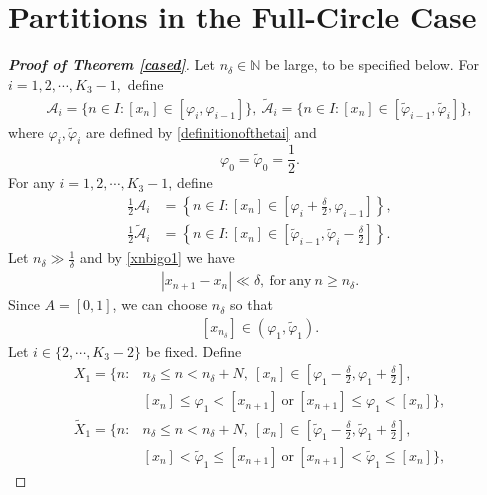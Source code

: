 \documentclass[12pt]{amsart}
\newcommand{\abs}[1]{\left\lvert #1 \right\rvert}
\theoremstyle{plain}
\theoremstyle{definition}
\begin{document}
\section{Partitions in the Full-Circle Case}\label{pcd}
\begin{proof}[\textbf{Proof of Theorem \ref{cased}}]
	Let $n_\delta\in\mathbb{N}$ be large, to be specified below.
	For $i=1,2,\cdots, K_3-1,$ define 
	\begin{align}
		\mathcal{A}_i=\{n\in I: \left[x_n\right]\in [\varphi_i,\varphi_{i-1}]\},\ \tilde{\mathcal{A}}_i=\{n\in I: \left[x_n\right]\in [\tilde{\varphi}_{i-1},\tilde{\varphi}_i]\}, \label{definitionofai}
	\end{align}
	where $\varphi_i,\tilde{\varphi}_i$ are defined by \eqref{definitionofthetai} and 
	$$\varphi_0=\tilde{\varphi}_0=\frac{1}{2}.$$ 
	For any $i=1,2,\cdots,K_3-1$, define
\begin{align}
\frac{1}{2}\mathcal{A}_i&=\left\{n\in I: \left[x_n\right]\in \left[\varphi_{i}+\frac{\delta}{2},\varphi_{i-1}\right]\right\},\label{deofhalfai}\\  
\frac{1}{2}\tilde{\mathcal{A}}_i&=\left\{n\in I: \left[x_n\right]\in \left[\tilde{\varphi}_{i-1},\tilde{\varphi}_{i}-\frac{\delta}{2}\right]\right\}.\label{deofhalfai2}
\end{align}
Let  $n_\delta\gg \frac{1}{\delta}$ and by \eqref{xnbigo1} we have
\begin{align}
	\abs{x_{n+1}-x_n}\ll \delta, \ \mathrm{for\ any\ } n\geq n_\delta.\label{deltaxnllvarepsilon}
\end{align} 
Since $A=[0,1]$, we can choose $n_\delta$ so that
\begin{align}
	\left[x_{n_{\delta}}\right]\in (\varphi_1,\tilde{\varphi}_1).\label{xne}
\end{align}
	Let $i\in\{2,\cdots,K_3-2\}$ be fixed. Define
	\begin{align}
		X_1={\Bigg\{}n: & n_\delta\leq n< n_\delta+N,\ [x_n]\in\left[\varphi_1-\frac{\delta}{2},\varphi_1+\frac{\delta}{2}\right],\label{definitionofX1}\\ 
		&[x_n]\leq \varphi_1< [x_{n+1}]\ \mathrm{or}\ [x_{n+1}]\leq \varphi_1< [x_n]{\Bigg\}},\nonumber
	\end{align}
	\begin{align}
		\label{definitionofX1tilde}\tilde{X}_1={\Bigg\{}n: & n_\delta\leq n< n_\delta+N,\ [x_n]\in\left[\tilde{\varphi}_1-\frac{\delta}{2},\tilde{\varphi}_1+\frac{\delta}{2}\right],\\
		 &[x_n]< \tilde{\varphi}_1\leq [x_{n+1}]\ \mathrm{or}\ [x_{n+1}]< \tilde{\varphi}_1\leq [x_n]{\Bigg\}},\nonumber

\end{align}
\end{proof}
\end{document}
